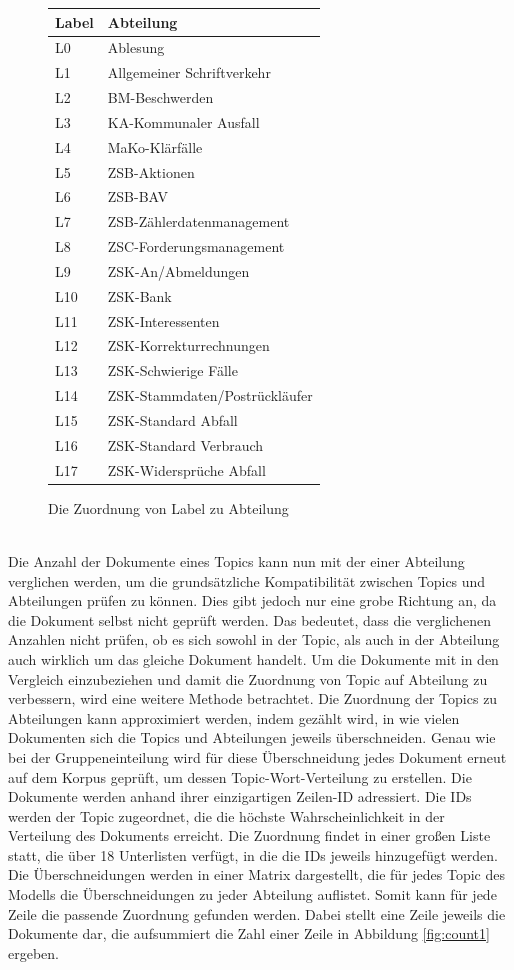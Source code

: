 \documentclass[german,version-2020-11]{uzl-thesis}
\begin{document}
\begin{figure}[h]
\begin{center}
\begin{tabular}{ll}
\hline
\hline
Label&Abteilung\\
\hline
L0&Ablesung\\
L1&Allgemeiner Schriftverkehr\\
L2&BM-Beschwerden\\
L3&KA-Kommunaler Ausfall\\
L4&MaKo-Klärfälle\\
L5&ZSB-Aktionen\\
L6&ZSB-BAV\\
L7&ZSB-Zählerdatenmanagement\\
L8&ZSC-Forderungsmanagement\\
L9&ZSK-An/Abmeldungen\\
L10&ZSK-Bank\\
L11&ZSK-Interessenten\\
L12&ZSK-Korrekturrechnungen\\
L13&ZSK-Schwierige Fälle\\
L14&ZSK-Stammdaten/Postrückläufer\\
L15&ZSK-Standard Abfall\\
L16&ZSK-Standard Verbrauch\\
L17&ZSK-Widersprüche Abfall\\
\hline
\hline
\end{tabular}
\caption{Die Zuordnung von Label zu Abteilung}
\label{fig:labels}
\end{center}
\end{figure}\\


Die Anzahl der Dokumente eines Topics kann nun mit der einer Abteilung verglichen werden, um die grundsätzliche Kompatibilität zwischen Topics und Abteilungen prüfen zu können. Dies gibt jedoch nur eine grobe Richtung an, da die Dokument selbst nicht geprüft werden. Das bedeutet, dass die verglichenen Anzahlen nicht prüfen, ob es sich sowohl in der Topic, als auch in der Abteilung auch wirklich um das gleiche Dokument handelt. Um die Dokumente mit in den Vergleich einzubeziehen und damit die Zuordnung von Topic auf Abteilung zu verbessern, wird eine weitere Methode betrachtet. Die Zuordnung der Topics zu Abteilungen kann approximiert werden, indem gezählt wird, in wie vielen Dokumenten sich die Topics und Abteilungen jeweils überschneiden. Genau wie bei der Gruppeneinteilung wird für diese Überschneidung jedes Dokument erneut auf dem Korpus geprüft, um dessen Topic-Wort-Verteilung zu erstellen. Die Dokumente werden anhand ihrer einzigartigen Zeilen-ID adressiert. Die IDs werden der Topic zugeordnet, die die höchste Wahrscheinlichkeit in der Verteilung des Dokuments erreicht. Die Zuordnung findet in einer großen Liste statt, die über 18 Unterlisten verfügt, in die die IDs jeweils hinzugefügt werden. Die Überschneidungen werden in einer Matrix dargestellt, die für jedes Topic des Modells die Überschneidungen zu jeder Abteilung auflistet. Somit kann für jede Zeile die passende Zuordnung gefunden werden. Dabei stellt eine Zeile jeweils die Dokumente dar, die aufsummiert die Zahl einer Zeile in Abbildung \ref{fig:count1} ergeben. 
\end{document}
